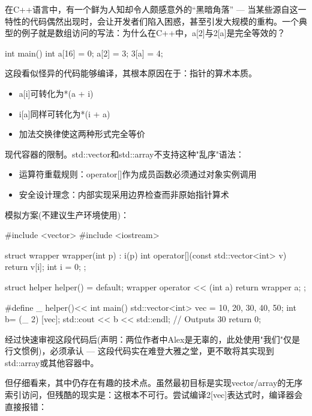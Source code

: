 在C++语言中，有一个鲜为人知却令人颇感意外的“黑暗角落” --- 当某些源自这一特性的代码偶然出现时，会让开发者们陷入困惑，甚至引发大规模的重构。一个典型的例子就是数组访问的写法：为什么在C++中，a[2]与2[a]是完全等效的？

\begin{cpp}
int main() {
  int a[16] = {0};
  a[2] = 3;
  3[a] = 4;
}
\end{cpp}

这段看似怪异的代码能够编译，其根本原因在于：指针的算术本质。

\begin{itemize}
\item 
a[i]可转化为*(a + i)

\item 
i[a]同样可转化为*(i + a)

\item 
加法交换律使这两种形式完全等价
\end{itemize}

现代容器的限制。std::vector和std::array不支持这种"乱序"语法：

\begin{itemize}
\item 
运算符重载规则：operator[]作为成员函数必须通过对象实例调用

\item 
安全设计理念：内部实现采用边界检查而非原始指针算术
\end{itemize}

模拟方案(不建议生产环境使用)：

\begin{cpp}
#include <vector>
#include <iostream>

struct wrapper {
  wrapper(int p) : i(p) {}
  int operator[](const std::vector<int> v) {return v[i];}
  int i = 0;
};

struct helper {
  helper() = default;
  wrapper operator << (int a) { return wrapper {a}; }
};

#define _ helper()<<
int main() {
  std::vector<int> vec = {10, 20, 30, 40, 50};
  int b= (_ 2) [vec];
  std::cout << b << std::endl; // Outputs 30
  return 0;
}
\end{cpp}

经过快速审视这段代码后(声明：两位作者中Alex是无辜的，此处使用"我们"仅是行文惯例)，必须承认 --- 这段代码实在难登大雅之堂，更不敢将其实现到std::array或其他容器中。

但仔细看来，其中仍存在有趣的技术点。虽然最初目标是实现vector/array的无序索引访问，但残酷的现实是：这根本不可行。尝试编译2[vec]表达式时，编译器会直接报错：

